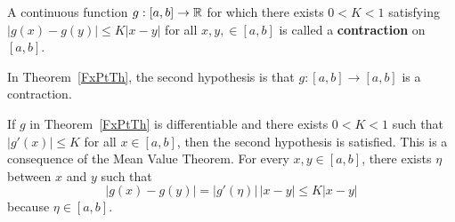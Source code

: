 \begin{defn}
A continuous function $g:[a,b]\rightarrow \mathbb{R}$ for which there exists
$0<K<1$ satisfying $|g(x)-g(y)|\leq K |x-y|$ for all $x, y, \in [a,b]$
is called a {\bfseries contraction} on
$[a,b]$.
\end{defn}

\begin{rmk}
In Theorem~\ref{FxPtTh}, the second hypothesis is that
$g:[a,b]\rightarrow [a,b]$ is a contraction.

If $g$ in Theorem~\ref{FxPtTh} is differentiable and there exists
$0<K<1$ such that $|g'(x)|\leq K$ for all $x\in [a,b]$, then the
second hypothesis is satisfied.  This is a consequence of the Mean
Value Theorem.  For every $x, y \in [a,b]$, there exists $\eta$ between
$x$ and $y$ such that
\[
|g(x)-g(y)| = |g'(\eta)|\, |x-y| \leq K |x-y|
\]
because $\eta \in [a,b]$.
\label{FxPtThDer}
\end{rmk}

